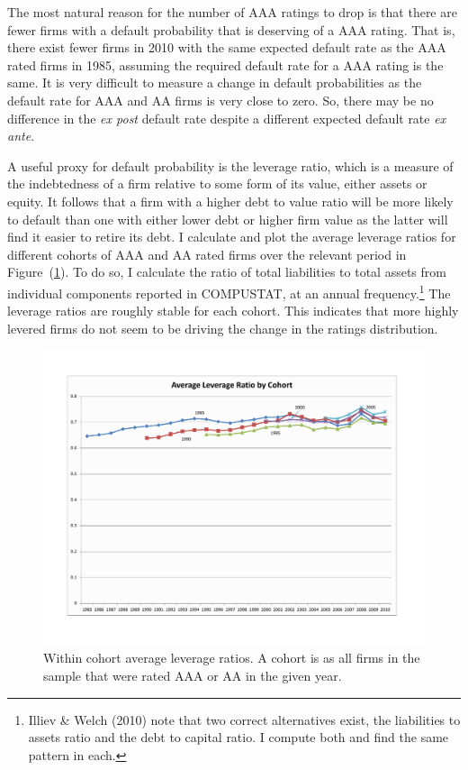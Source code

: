 \documentclass[notitlepage]{article}
\begin{document}
The most natural reason for the number of AAA ratings to drop is that there are fewer firms with a default probability that is deserving of a AAA rating. That is, there exist fewer firms in 2010 with the same expected default rate as the AAA rated firms in 1985, assuming the required default rate for a AAA rating is the same. It is very difficult to measure a change in default probabilities as the default rate for AAA and AA firms is very close to zero. So, there may be no difference in the \emph{ex post} default rate despite a different expected default rate \textit{ex ante}. 

A useful proxy for default probability is the leverage ratio, which is a measure of the indebtedness of a firm relative to some form of its value, either assets or equity. It follows that a firm with a higher debt to value ratio will be more likely to default than one with either lower debt or higher firm value as the latter will find it easier to retire its debt. I calculate and plot the average leverage ratios for different cohorts of AAA and AA rated firms over the relevant period in Figure~(\ref{fig:coh_lev}). To do so, I calculate the ratio of total liabilities to total assets from individual components reported in COMPUSTAT, at an annual frequency.\footnote{Illiev \& Welch (2010) note that two correct alternatives exist, the liabilities to assets ratio and the debt to capital ratio. I compute both and find the same pattern in each.} The leverage ratios are roughly stable for each cohort. This indicates that more highly levered firms do not seem to be driving the change in the ratings distribution.

\begin{figure}[ht]
\centering
\includegraphics[width=\textwidth]{leverage_by_cohort_clr.pdf}
\caption{Within cohort average leverage ratios. A cohort is as all firms in the sample that were rated AAA or AA in the given year.}
\label{fig:coh_lev}
\end{figure}
\end{document}
